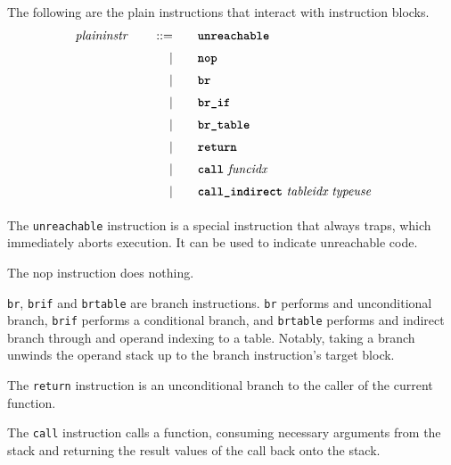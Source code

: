The following are the plain instructions that interact with instruction blocks.
\begin{alignat*}{9}
    && \textit{plaininstr}\ &&\quad ::= &\quad && \textbf{\texttt{unreachable}}\ \quad &&  \\[1mm]
    &&       &&\quad | &\quad && \textbf{\texttt{nop}}\ \quad && \\[1mm]
    &&       &&\quad | &\quad && \textbf{\texttt{br}}\ \quad && \\[1mm]
    &&       &&\quad | &\quad && \textbf{\texttt{br\textunderscore if}}\ \quad && \\[1mm]
    &&       &&\quad | &\quad && \textbf{\texttt{br\textunderscore table}}\ \quad && \\[1mm]
    &&       &&\quad | &\quad && \textbf{\texttt{return}}\ \quad && \\[1mm]
    &&       &&\quad | &\quad && \textbf{\texttt{call}}\ \textit{funcidx}\ \quad && \\[1mm]
    &&       &&\quad | &\quad && \textbf{\texttt{call\textunderscore indirect}}\ \textit{tableidx}\ \textit{typeuse}\ \quad && \\[1mm]
\end{alignat*}

The \texttt{unreachable} instruction is a special instruction that always traps, which immediately aborts execution. It can be used to indicate unreachable code. \vspace{1em}

The nop instruction does nothing. \vspace{1em}

\texttt{br}, \texttt{br\textunderscore if} and \texttt{br\textunderscore table} are branch instructions.
\texttt{br} performs and unconditional branch, \texttt{br\textunderscore if} performs a conditional branch, and \texttt{br\textunderscore table}
performs and indirect branch through and operand indexing to a table. \vspace{1em} Notably, taking a branch unwinds the operand stack up to the branch instruction's target block. \vspace{1em}

The \texttt{return} instruction is an unconditional branch to the caller of the current function.\vspace{1em}

The \texttt{call} instruction calls a function, consuming necessary arguments from the stack and returning the result values of the call back onto the stack. \vspace{1em}

